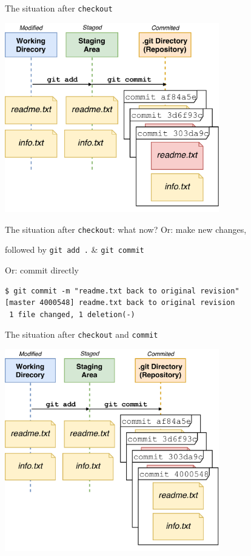 \documentclass[
  11pt,
  american,
  ignorenonframetext,
  aspectratio=43,
  compress,
  xcolor=dvipsnames]{beamer}
\begin{document}
\begin{frame}{The situation after \texttt{checkout}}
\protect\hypertarget{the-situation-after-checkout-1}{}
\begin{center}
\includegraphics[width=0.7\textwidth]{./images/git_workflow_after_timemachine_1.pdf}
\end{center}
\end{frame}

\begin{frame}[fragile]{The situation after \texttt{checkout}: what now?}
\protect\hypertarget{the-situation-after-checkout-what-now}{}
Or: make new changes,

followed by \texttt{git\ add\ .} \& \texttt{git\ commit}

Or: commit directly

\begin{verbatim}
$ git commit -m "readme.txt back to original revision"
[master 4000548] readme.txt back to original revision
 1 file changed, 1 deletion(-)
\end{verbatim}
\end{frame}

\begin{frame}{The situation after \texttt{checkout} and \texttt{commit}}
\protect\hypertarget{the-situation-after-checkout-and-commit}{}
\begin{center}
\includegraphics[width=0.7\textwidth]{./images/git_workflow_after_timemachine_2.pdf}
\end{center}
\end{frame}
\end{document}
